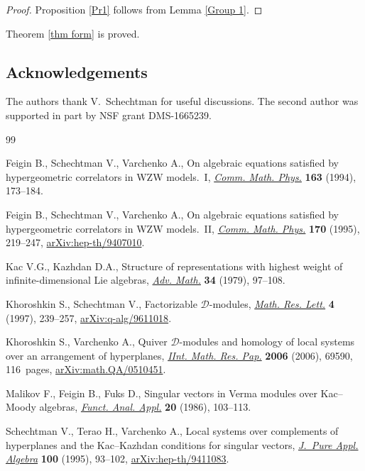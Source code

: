 \documentclass[pdftex]{sigma}
\numberwithin{equation}{section}
\begin{document}
\begin{proof}
Proposition \ref{Pr1} follows from Lemma \ref{Group 1}.
\end{proof}

Theorem \ref{thm form} is proved.

\subsection*{Acknowledgements}
The authors thank V.~Schechtman for useful discussions. The second author was supported in part by NSF grant DMS-1665239.

\begin{thebibliography}{99}
\footnotesize\itemsep=0pt

Feigin B., Schechtman V., Varchenko A., On algebraic equations satisfied by
 hypergeometric correlators in {WZW} models.~{I}, \href{https://doi.org/10.1007/BF02101739}{\textit{Comm. Math. Phys.}}
 \textbf{163} (1994), 173--184.

Feigin B., Schechtman V., Varchenko A., On algebraic equations satisfied by
 hypergeometric correlators in {WZW} models.~{II}, \href{https://doi.org/10.1007/BF02099447}{\textit{Comm. Math. Phys.}}
 \textbf{170} (1995), 219--247, \href{https://arxiv.org/abs/hep-th/9407010}{arXiv:hep-th/9407010}.

Kac V.G., Kazhdan D.A., Structure of representations with highest weight of
 infinite-dimensional {L}ie algebras, \href{https://doi.org/10.1016/0001-8708(79)90066-5}{\textit{Adv. Math.}} \textbf{34} (1979), 97--108.

Khoroshkin S., Schechtman V., Factorizable {${\mathcal D}$}-modules,
 \href{https://doi.org/10.4310/MRL.1997.v4.n2.a6}{\textit{Math. Res. Lett.}} \textbf{4} (1997), 239--257,
 \mbox{\href{https://arxiv.org/abs/q-alg/9611018}{arXiv:q-alg/9611018}}.

Khoroshkin S., Varchenko A., Quiver {$\mathcal D$}-modules and homology of
 local systems over an arrangement of hyperplanes, \href{https://doi.org/10.1155/IMRP/2006/69590}{\textit{IInt. Math. Res.
 Pap.}} \textbf{2006} (2006), 69590, 116~pages, \href{https://arxiv.org/abs/math.QA/0510451}{arXiv:math.QA/0510451}.

Malikov F., Feigin B., Fuks D., Singular vectors in {V}erma modules over
 {K}ac--{M}oody algebras, \href{https://doi.org/10.1007/BF01077264}{\textit{Funct. Anal. Appl.}} \textbf{20} (1986), 103--113.

Schechtman V., Terao H., Varchenko A., Local systems over complements of
 hyperplanes and the {K}ac--{K}azhdan conditions for singular vectors,
 \href{https://doi.org/10.1016/0022-4049(95)00014-N}{\textit{J.~Pure Appl. Algebra}} \textbf{100} (1995), 93--102,
 \href{https://arxiv.org/abs/hep-th/9411083}{arXiv:hep-th/9411083}.


\end{thebibliography}
\end{document}
